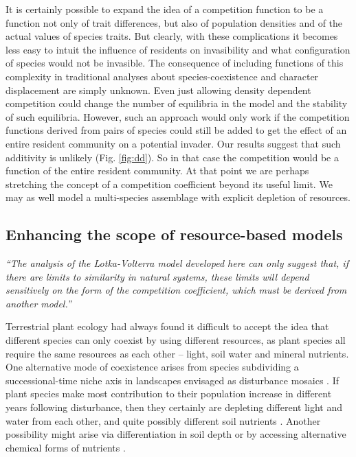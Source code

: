 \documentclass[a4paper,11pt]{article}
\begin{document}
It is certainly possible to expand the idea of a competition function to
be a function not only of trait differences, but also of population
densities and of the actual values of species traits. But clearly, with these complications it becomes less easy to intuit the influence of residents on invasibility and what configuration of species would not be invasible. The consequence of including functions of
this complexity in traditional analyses about species-coexistence and
character displacement are simply unknown.  Even just allowing density
dependent competition could change the number of equilibria in the
model and the stability of such equilibria.
%
However, such an approach would only work if the competition functions
derived from pairs of species could still be added to get the effect
of an entire resident community on a potential invader.
%
Our results suggest that such additivity is unlikely
(Fig. \ref{fig:dd}). So in that case the competition would be a
function of the entire resident community.  At that point we are
perhaps stretching the concept of a competition coefficient
beyond its useful limit. We may as well
model a multi-species assemblage with explicit depletion of resources.

\subsection{Enhancing the scope of resource-based models}

\emph{``The analysis of the Lotka-Volterra model developed here can only
suggest that, if there are limits to similarity in natural systems, these
limits will depend sensitively on the form of the competition coefficient,
which must be derived from another model.''}\citep{Abrams-1975}

Terrestrial plant ecology had always found it difficult to accept the
idea that different species can only coexist by using different
resources, as plant species all require the same resources as each other --
light, soil water and mineral nutrients. One alternative mode of coexistence
arises from species subdividing a successional-time niche axis in
landscapes envisaged as disturbance mosaics \citep{Connell-1978}. If
plant species make most contribution to their population increase in
different years following disturbance, then they certainly are
depleting different light and water from each other, and quite
possibly different soil nutrients \citep{Moorcroft-2001}. Another
possibility might arise via differentiation in soil depth or by accessing
alternative chemical forms of nutrients \citep{Tilman-1977}.
\end{document}
